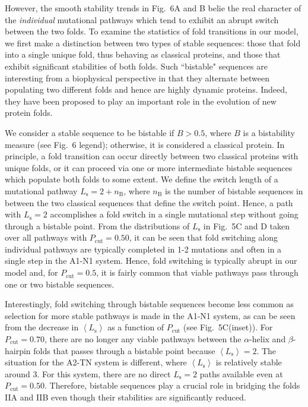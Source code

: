 \documentclass[%
 aip,
rsi,%
 amsmath,amssymb,
 reprint,%
]{revtex4-1}
\newcommand {\Pcut}     	{{P_\mathrm{cut}}}
\begin{document}

However, the smooth stability trends in Fig.~6A and B belie the real character of the \textit{individual} mutational pathways which tend to exhibit an abrupt switch between the two folds. To examine the statistics of fold transitions in our model, we first make a distinction between two types of stable sequences: those that fold into a single unique fold, thus behaving as classical proteins, and those that exhibit significant stabilities of both folds. Such ``bistable" sequences are interesting from a biophysical perspective in that they alternate between populating two different folds and hence are highly dynamic proteins. Indeed, they have been proposed to play an important role in the evolution of new protein folds.~\cite{Sikosek2016} 

We consider a stable sequence to be bistable if $B>0.5$, where $B$ is a bistability measure (see Fig.~6 legend); otherwise, it is considered a classical protein. In principle, a fold transition can occur directly between two classical proteins with unique folds, or it can proceed via one or more intermediate bistable sequences which populate both folds to some extent. We  define the switch length of a mutational pathway $L_\mathrm{s}=2+n_\mathrm{B}$, where $n_\mathrm{B}$ is the number of bistable sequences in between the two classical sequences that define the switch point. Hence, a path with $L_\mathrm{s}=2$ accomplishes a fold switch in a single mutational step without going through a bistable point. From the distributions of  $L_\mathrm{s}$ in Fig.~5C and D taken over all pathways with $\Pcut=0.50$, it can be seen that fold switching along individual pathways are typically completed in 1-2 mutations and often in a single step in the A1-N1 system. Hence, fold switching is typically abrupt in our model and, for $\Pcut = 0.5$, it is fairly common that viable pathways pass through one or two bistable sequences. 

Interestingly, fold switching through bistable sequences become less common as selection for more stable pathways is made in the A1-N1 system, as can be seen from the decrease in $\left <L_\mathrm{s}\right >$ as a function of $\Pcut$ (see Fig.~5C(inset)). For $\Pcut=0.70$, there are no longer any viable pathways between the $\alpha$-helix and $\beta$-hairpin folds that passes through a bistable point because $\left <L_\mathrm{s}\right > =  2$. The situation for the A2-TN system is different, where $\left <L_\mathrm{s}\right >$ is relatively stable around 3. For this system, there are no direct $L_\mathrm{s}=2$ paths available even at $\Pcut=0.50$. Therefore, bistable sequences play a crucial role in bridging the folds IIA and IIB even though their stabilities are significantly reduced. 
\end{document}
